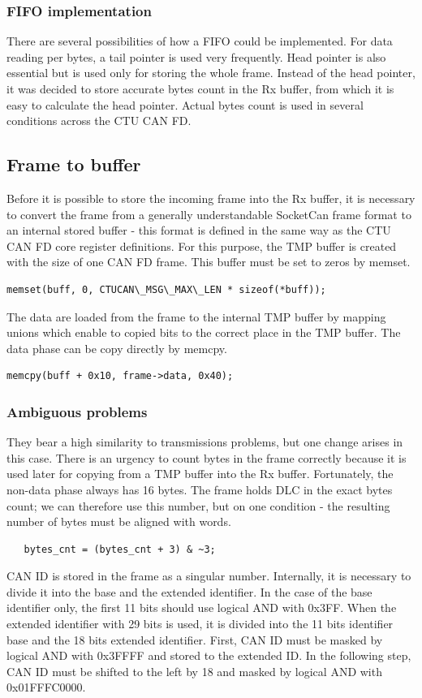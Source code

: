 \documentclass{ctuthesis}
\begin{document}
  \subsubsection{FIFO implementation}
   There are several possibilities of how a FIFO could be implemented. For data reading per bytes, a tail pointer is used very frequently. Head pointer is also essential but is used only for storing the whole frame. Instead of the head pointer, it was decided to store accurate bytes count in the Rx buffer, from which it is easy to calculate the head pointer. Actual bytes count is used in several conditions across the CTU CAN FD.
 
 \subsection{Frame to buffer}
  Before it is possible to store the incoming frame into the Rx buffer, it is necessary to convert the frame from a generally understandable SocketCan frame format to an internal stored buffer - this format is defined in the same way as the CTU CAN FD core register definitions. For this purpose, the TMP buffer is created with the size of one CAN FD frame. This buffer must be set to zeros by memset.
  \begin{verbatim}memset(buff, 0, CTUCAN\_MSG\_MAX\_LEN * sizeof(*buff));\end{verbatim}
  The data are loaded from the frame to the internal TMP buffer by mapping unions which enable to copied bits to the correct place in the TMP buffer. The data phase can be copy directly by memcpy.
  \begin{verbatim}memcpy(buff + 0x10, frame->data, 0x40);\end{verbatim}
 
  \subsubsection{Ambiguous problems}
   They bear a high similarity to transmissions problems, but one change arises in this case. There is an urgency to count bytes in the frame correctly because it is used later for copying from a TMP buffer into the Rx buffer. Fortunately, the non-data phase always has 16 bytes. The frame holds DLC in the exact bytes count; we can therefore use this number, but on one condition - the resulting number of bytes must be aligned with words.
   \begin{verbatim}   bytes_cnt = (bytes_cnt + 3) & ~3;\end{verbatim}
   CAN ID is stored in the frame as a singular number. Internally, it is necessary to divide it into the base and the extended identifier. In the case of the base identifier only, the first 11 bits should use logical AND with 0x3FF. When the extended identifier with 29 bits is used, it is divided into the 11 bits identifier base and the 18 bits extended identifier. First, CAN ID must be masked by logical AND with 0x3FFFF and stored to the extended ID. In the following step, CAN ID must be shifted to the left by 18 and masked by logical AND with 0x01FFFC0000.
  
\end{document}
